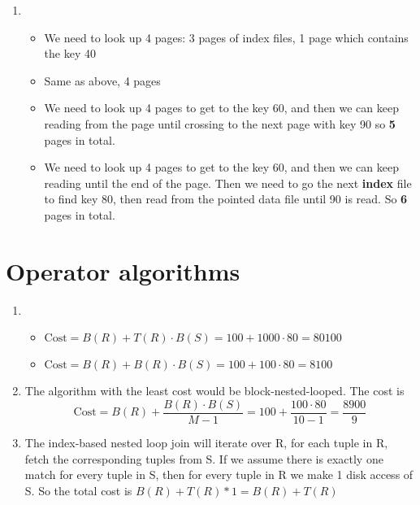 \documentclass[10pt]{myland}
\begin{document}
\begin{enumerate}[label=\textbf{\arabic*.}, listparindent=0.0em, itemsep=1em]
    \item
        \begin{itemize}
            \item We need to look up 4 pages: 3 pages of index files, 1 page which contains the key 40
            \item Same as above, 4 pages
            \item We need to look up 4 pages to get to the key 60, and then we can keep reading from the page until
                crossing to the next page with key 90 so \textbf{5} pages in total.
            \item We need to look up 4 pages to get to the key 60, and then we can keep reading until the end of the
                page. Then we need to go the next \textbf{index} file to find key 80, then read from the pointed data
                file until 90 is read. So \textbf{6} pages in total.
        \end{itemize}
\end{enumerate}


\section{Operator algorithms}

\begin{enumerate}[label=\textbf{\arabic*.}, listparindent=0.0em, itemsep=1em]
    \item
        \begin{itemize}
            \item $\text{Cost} = B(R) + T(R)\cdot B(S) = 100 + 1000\cdot 80 = 80100$
            \item $\text{Cost} = B(R) + B(R)\cdot B(S) = 100 + 100\cdot 80 = 8100$
        \end{itemize}
    \item The algorithm with the least cost would be block-nested-looped. The cost is
    \[\text{Cost} = B(R) + \frac{B(R)\cdot B(S)}{M - 1} = 100 + \frac{100\cdot 80}{10 - 1} = \frac{8900}{9}\]
    \item The index-based nested loop join will iterate over R, for each tuple in R, fetch the corresponding tuples from
    S. If we assume there is exactly one match for every tuple in S, then for every tuple in R we make 1 disk access of
    S. So the total cost is $B(R) + T(R) * 1 = B(R) + T(R)$
\end{enumerate}
\end{document}
